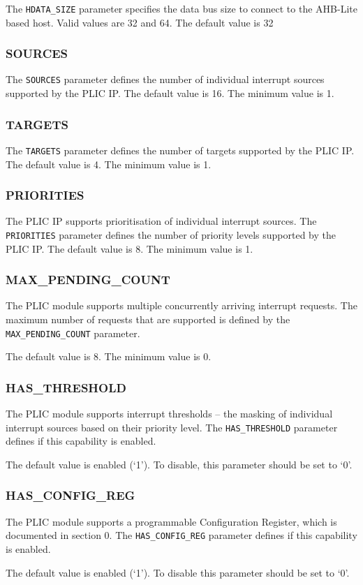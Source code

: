 The \texttt{HDATA\_SIZE} parameter specifies the data bus size to
connect to the AHB-Lite based host. Valid values are 32 and 64. The
default value is 32

\hypertarget{SOURCES}{\subsubsection{SOURCES}\label{sec:SOURCES}}

The \texttt{SOURCES} parameter defines the number of individual
interrupt sources supported by the PLIC IP. The default value is 16. The
minimum value is 1.

\hypertarget{TARGETS}{\subsubsection{TARGETS}\label{sec:TARGETS}}

The \texttt{TARGETS} parameter defines the number of targets supported
by the PLIC IP. The default value is 4. The minimum value is 1.

\subsubsection{PRIORITIES}

\sloppy
The PLIC IP supports prioritisation of individual interrupt sources. The \texttt{PRIORITIES} parameter defines the number of priority levels supported by the PLIC IP. The default value is 8. The minimum value is 1.

\subsubsection{MAX\_PENDING\_COUNT}

\sloppy
The PLIC module supports multiple concurrently arriving interrupt
requests. The maximum number of requests that are supported is defined
by the \texttt{MAX\_PENDING\_COUNT} parameter.

The default value is 8. The minimum value is 0.

\subsubsection{HAS\_THRESHOLD}

The PLIC module supports interrupt thresholds -- the masking of
individual interrupt sources based on their priority level. The
\texttt{HAS\_THRESHOLD} parameter defines if this capability is enabled.

The default value is enabled (`1'). To disable, this parameter should be
set to `0'.

\subsubsection{HAS\_CONFIG\_REG}

The PLIC module supports a programmable Configuration Register, which is
documented in section 0. The \texttt{HAS\_CONFIG\_REG} parameter defines
if this capability is enabled.

The default value is enabled (`1'). To disable this parameter should be
set to `0'.
